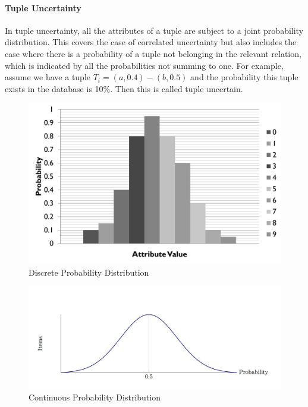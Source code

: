 \paragraph{Tuple Uncertainty}
In tuple uncertainty, all the attributes of a tuple are subject to a joint probability distribution. This covers the case of correlated uncertainty but also includes the case where there is a probability of a tuple not belonging in the relevant relation, which is indicated by all the probabilities not summing to one. For example, assume we have a tuple $T_i = (a, 0.4) - (b, 0.5)$ and the probability this tuple exists in the database is 10\%. Then this is called tuple uncertain.
        \begin{figure}
        \centering
            \includegraphics[width=1\textwidth]{../images/d_probability}
        \caption{Discrete Probability Distribution}
        \label{figure:d_probability}
        \end{figure}
        \begin{figure}
        \centering
            \includegraphics[width=1\textwidth]{../images/c_probability}
        \caption{Continuous Probability Distribution}
        \label{figure:c_probability}
        \end{figure}
